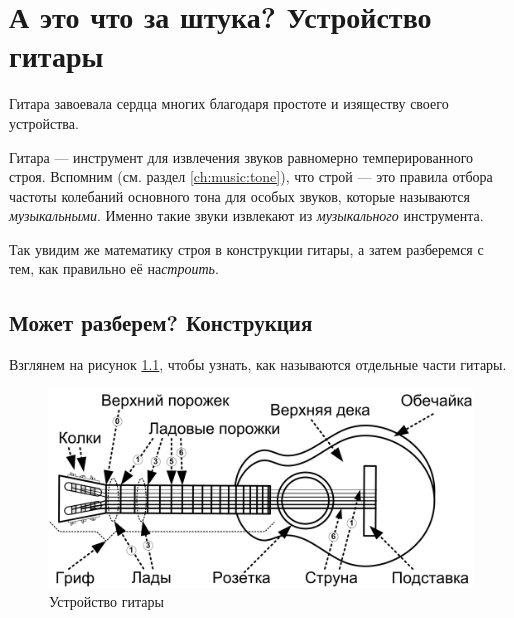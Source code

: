 \chapter{А это что за штука? Устройство гитары}
\label{ch:guitar}

Гитара завоевала сердца многих благодаря простоте и изяществу своего устройства.

Гитара --- инструмент для извлечения звуков равномерно темперированного строя. Вспомним (см. раздел \ref{ch:music:tone}), что строй --- это правила отбора частоты колебаний основного тона для особых звуков, которые называются \emph{музыкальными}. Именно такие звуки извлекают из \emph{музыкального} инструмента.

Так увидим же математику строя в конструкции гитары, а затем разберемся с тем, как правильно её на\emph{строить}.


\section{Может разберем? Конструкция}
\label{ch:guitar:construction}

Взглянем на рисунок \ref{fig:guitar:construction}, чтобы узнать, как называются отдельные части гитары.

\begin{figure}[!ht]
    \centering
    \includegraphics{fig/guitar-construction} 
    \caption{Устройство гитары}\label{fig:guitar:construction}
\end{figure} 

